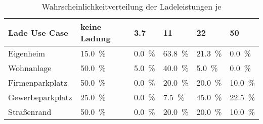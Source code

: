 {
\renewcommand{\arraystretch}{1.2}%
\begin{table}[H]
	\begin{center}
		\caption{Wahrscheinlichkeitverteilung der Ladeleistungen je \UC}
		\begin{tabu} to \textwidth {X[1.7] X[1.3, r] X[1, r] X[1, r] X[1, r] X[1, r]}
			\hline
			Lade Use   Case  & keine Ladung        & \SI{3.7}{\kw}      & \SI{11}{\kw}        & \SI{22}{\kw}        & \SI{50}{\kw}        \\ \hline
			Eigenheim        & \SI{15.0}{\percent} & \SI{0.0}{\percent} & \SI{63.8}{\percent} & \SI{21.3}{\percent} & \SI{0.0}{\percent}  \\
			Wohnanlage       & \SI{50.0}{\percent} & \SI{5.0}{\percent} & \SI{40.0}{\percent} & \SI{5.0}{\percent}  & \SI{0.0}{\percent}  \\
			Firmenparkplatz  & \SI{50.0}{\percent} & \SI{0.0}{\percent} & \SI{20.0}{\percent} & \SI{20.0}{\percent} & \SI{10.0}{\percent} \\
			Gewerbeparkplatz & \SI{25.0}{\percent} & \SI{0.0}{\percent} & \SI{7.5}{\percent}  & \SI{45.0}{\percent} & \SI{22.5}{\percent} \\
			Straßenrand      & \SI{50.0}{\percent} & \SI{0.0}{\percent} & \SI{20.0}{\percent} & \SI{20.0}{\percent} & \SI{10.0}{\percent} \\ \hline
		\end{tabu}
		\label{tab:UCProbability2050}
	\end{center}
	\vspace{-3mm}%
\end{table}
}